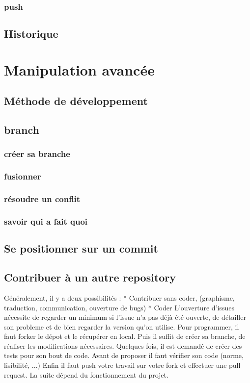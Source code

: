 \documentclass[a4paper,10pt]{article}
\begin{document}
     \subsubsection{push}
  \subsection{Historique}
\section{Manipulation avancée}
  \subsection{Méthode de développement}
  \subsection{branch}
     \subsubsection{créer sa branche}
     \subsubsection{fusionner}
     \subsubsection{résoudre un conflit}
     \subsubsection{savoir qui a fait quoi}
  \subsection{Se positionner sur un commit}
  \subsection{Contribuer à un autre repository}
Généralement, il y a deux possibilités : 
* Contribuer sans coder, (graphisme, traduction, communication, ouverture de bugs)
* Coder
L'ouverture d'issues nécessite de regarder un minimum si l'issue n'a pas déjà été ouverte, de détailler son probleme et de bien regarder la version qu'on utilise.
Pour programmer, il faut forker le dépot et le récupérer en local.
Puis il suffit de créer sa branche, de réaliser les modifications nécessaires.
Quelques fois, il est demandé de créer des tests pour son bout de code.
Avant de proposer il faut vérifier son code (norme, lisibilité, ...)
Enfin il faut push votre travail sur votre fork et effectuer une pull request.
La suite dépend du fonctionnement du projet.
\end{document}
